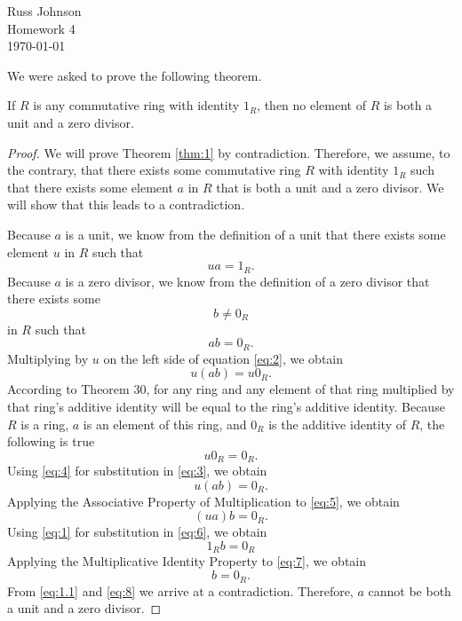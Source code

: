 

\begin{flushright}
Russ Johnson\\
Homework 4\\
\today\\
\end{flushright}
We were asked to prove the following theorem.
\begin{thm}\label{thm:1}
If $R$ is any commutative ring with identity $1_R$, then no element of $R$ is both a unit and a zero
divisor.
\end{thm}
\begin{proof}
We will prove Theorem \ref{thm:1} by contradiction. Therefore, we assume, to the contrary, that there exists some commutative ring $R$ with identity $ 1_R $ such that there exists some element $a$ in $R$ that is both a unit and a zero divisor. We will show that this leads to a contradiction.

Because $a$ is a unit, we know from the definition of a unit that there exists some element $u$ in $R$ such that 
\begin{equation}\label{eq:1}
ua = 1_R.
\end{equation}
Because $a$ is a zero divisor, we know from the definition of a zero divisor that there exists some 
\begin{equation}\label{eq:1.1}
b\neq 0_R 
\end{equation}
in $R$ such that
\begin{equation}\label{eq:2}
ab=0_R.
\end{equation}
Multiplying by $u$ on the left side of equation \eqref{eq:2}, we obtain
\begin{equation}\label{eq:3}
u(ab) = u0_R.
\end{equation}
According to Theorem 30, for any ring and any element of that ring multiplied by that ring's additive identity will be equal to the ring's additive identity.  Because $R$ is a ring, $a$ is an element of this ring, and $0_R$ is the additive identity of $R$, the following is true
\begin{equation}\label{eq:4}
u0_R = 0_R.
\end{equation}
Using \eqref{eq:4} for substitution in \eqref{eq:3}, we obtain
\begin{equation}\label{eq:5}
u(ab) = 0_R.
\end{equation}
Applying the Associative Property of Multiplication to \eqref{eq:5}, we obtain
\begin{equation}\label{eq:6}
(ua)b = 0_R.
\end{equation}
Using \eqref{eq:1} for substitution in \eqref{eq:6}, we obtain
\begin{equation}\label{eq:7}
1_R b = 0_R
\end{equation}
Applying the Multiplicative Identity Property to \eqref{eq:7}, we obtain
\begin{equation}\label{eq:8}
b = 0_R. 
\end{equation}
From \eqref{eq:1.1} and \eqref{eq:8} we arrive at a contradiction.  Therefore, $a$ cannot be both a unit and a zero divisor.


\end{proof}
